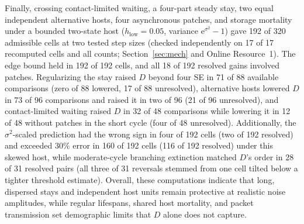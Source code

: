 Finally, crossing contact-limited waiting, a four-part steady stay, two equal independent alternative hosts, four asynchronous patches, and storage mortality under a bounded two-state host ($h_{\mathrm{low}} = 0.05$, variance $\mathrm{e}^{\sigma^2} - 1$) gave 192 of 320 admissible cells at two tested step sizes (checked independently on 17 of 17 recomputed cells and all counts; Section~\ref{sec:mech} and Online Resource~1). The edge bound held in 192 of 192 cells, and all 18 of 192 resolved gains involved patches. Regularizing the stay raised $D$ beyond four SE in 71 of 88 available comparisons (zero of 88 lowered, 17 of 88 unresolved), alternative hosts lowered $D$ in 73 of 96 comparisons and raised it in two of 96 (21 of 96 unresolved), and contact-limited waiting raised $D$ in 32 of 48 comparisons while lowering it in 12 of 48 without patches in the short cycle (four of 48 unresolved). Additionally, the $\sigma^2$-scaled prediction had the wrong sign in four of 192 cells (two of 192 resolved) and exceeded $30\%$ error in 160 of 192 cells (116 of 192 resolved) under this skewed host, while moderate-cycle branching extinction matched $D$'s order in 28 of 31 resolved pairs (all three of 31 reversals stemmed from one cell tilted below a tighter threshold estimate). Overall, these computations indicate that long, dispersed stays and independent host units remain protective at realistic noise amplitudes, while regular lifespans, shared host mortality, and packet transmission set demographic limits that $D$ alone does not capture.
